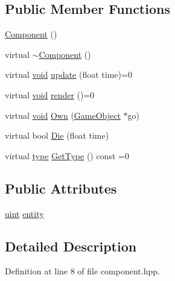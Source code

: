 \subsection*{Public Member Functions}
\begin{DoxyCompactItemize}
\item 
\hyperlink{class_component_a8775db6d1a2c1afc2e77cd3c8f39da6f}{Component} ()
\item 
virtual \hyperlink{class_component_a2e9aa4348314d981f05f67397ad2f872}{$\sim$\-Component} ()
\item 
virtual \hyperlink{_s_d_l__opengles2__gl2ext_8h_ae5d8fa23ad07c48bb609509eae494c95}{void} \hyperlink{class_component_a20c791684d452b36fcce40ac9038c735}{update} (float time)=0
\item 
virtual \hyperlink{_s_d_l__opengles2__gl2ext_8h_ae5d8fa23ad07c48bb609509eae494c95}{void} \hyperlink{class_component_a0c67ccdaf754b96520e3428284a74a7f}{render} ()=0
\item 
virtual \hyperlink{_s_d_l__opengles2__gl2ext_8h_ae5d8fa23ad07c48bb609509eae494c95}{void} \hyperlink{class_component_af6a505dae181fc1a3498b779a4bd162e}{Own} (\hyperlink{class_game_object}{Game\-Object} $\ast$go)
\item 
virtual bool \hyperlink{class_component_adf7c2452a79ee10d2d1f658d6df5b0ff}{Die} (float time)
\item 
virtual \hyperlink{class_component_ad6d161b6acf7b843b55bb9feac7af71a}{type} \hyperlink{class_component_a1440354c23703096a6439d45ab85e4fd}{Get\-Type} () const =0
\end{DoxyCompactItemize}
\subsection*{Public Attributes}
\begin{DoxyCompactItemize}
\item 
\hyperlink{common_8hpp_a69aa29b598b851b0640aa225a9e5d61d}{uint} \hyperlink{class_component_a98c878b6e50bd78de3882e44bf3332e0}{entity}
\end{DoxyCompactItemize}


\subsection{Detailed Description}


Definition at line 8 of file component.\-hpp.



